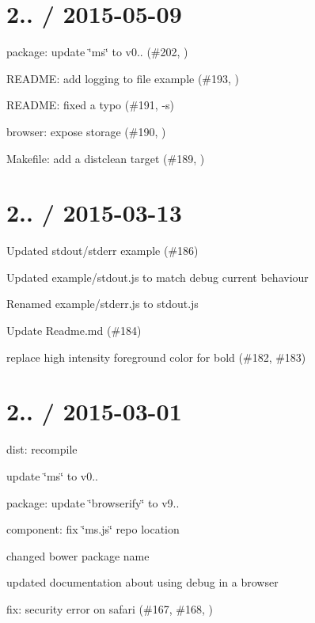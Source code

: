 \section*{2.. / 2015-\/05-\/09 }


\begin{DoxyItemize}
\item package\+: update \char`\"{}ms\char`\"{} to v0.. (\#202, )
\item R\+E\+A\+D\+ME\+: add logging to file example (\#193, )
\item R\+E\+A\+D\+ME\+: fixed a typo (\#191, -\/s)
\item browser\+: expose {\ttfamily storage} (\#190, )
\item Makefile\+: add a {\ttfamily distclean} target (\#189, )
\end{DoxyItemize}

\section*{2.. / 2015-\/03-\/13 }


\begin{DoxyItemize}
\item Updated stdout/stderr example (\#186)
\item Updated example/stdout.\+js to match debug current behaviour
\item Renamed example/stderr.\+js to stdout.\+js
\item Update Readme.\+md (\#184)
\item replace high intensity foreground color for bold (\#182, \#183)
\end{DoxyItemize}

\section*{2.. / 2015-\/03-\/01 }


\begin{DoxyItemize}
\item dist\+: recompile
\item update \char`\"{}ms\char`\"{} to v0..
\item package\+: update \char`\"{}browserify\char`\"{} to v9..
\item component\+: fix \char`\"{}ms.\+js\char`\"{} repo location
\item changed bower package name
\item updated documentation about using debug in a browser
\item fix\+: security error on safari (\#167, \#168, )
\end{DoxyItemize}

